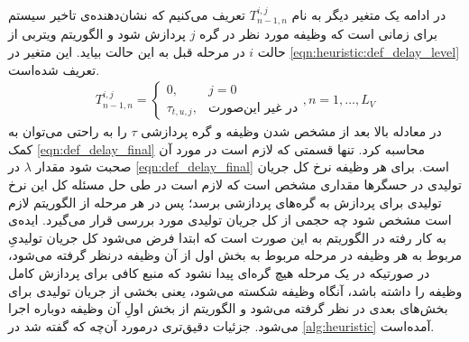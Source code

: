 	در ادامه یک متغیر دیگر به نام $T_{n-1,n}^{i,j}$ تعریف می‌کنیم که نشان‌دهنده‌ی تاخیر سیستم برای زمانی است که وظیفه مورد نظر در گره $j$ پردازش شود و الگوریتم ویتربی از حالت $i$ در مرحله قبل به این حالت بیاید. این متغیر در \cref{eqn:heuristic:def_delay_level} تعریف شده‌است. 
	\begin{align}\label{eqn:heuristic:def_delay_level}
		T_{n-1,n}^{i,j} =
		\begin{cases}
			0,				& \text{$j = 0$} \\
			\tau_{t,u,j},  	& \text{در غیر این‌صورت}
		\end{cases}
		,n = 1, \dots, L_V
	\end{align}
	در معادله بالا بعد از مشخص شدن وظیفه و گره پردازشی $\tau$ را به راحتی می‌توان به کمک \cref{eqn:def_delay_final} محاسبه کرد. تنها قسمتی که لازم است در مورد آن صحبت شود مقدار $\lambda$ در \cref{eqn:def_delay_final} است. برای هر وظیفه نرخ کل جریان تولیدی در حسگرها مقداری مشخص است که لازم است در طی حل مسئله کل این نرخ تولیدی برای پردازش به گره‌های پردازشی برسد؛ پس در هر مرحله از الگوریتم لازم است مشخص شود چه حجمی از کل جریان تولیدی مورد بررسی قرار می‌گیرد. ایده‌ی به کار رفته در الگوریتم به این صورت است که ابتدا فرض می‌شود کل جریان تولیدیِ مربوط به هر وظیفه در مرحله مربوط به بخش اول از آن وظیفه درنظر گرفته می‌شود، در صورتیکه در یک مرحله هیچ گره‌ای پیدا نشود که منبع کافی برای پردازش کامل وظیفه را داشته باشد، آنگاه وظیفه شکسته می‌شود، یعنی بخشی از جریان تولیدی برای بخش‌های بعدی در نظر گرفته می‌شود و الگوریتم از بخش اولِ آن وظیفه دوباره اجرا می‌شود. جزئیات دقیق‌تری درمورد آن‌چه که گفته شد در \cref{alg:heuristic} آمده‌است. 
	

